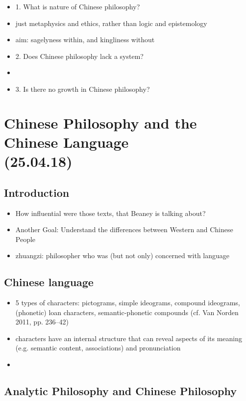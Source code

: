 \documentclass[emulatestandardclasses]{scrartcl}
\begin{document}
\begin{itemize}
  \item 1. What is nature of Chinese philosophy?
  \item just metaphysics and ethics, rather than logic and epistemology
  \item aim: sagelyness within, and kingliness without
  \item 2. Does Chinese philosophy lack a system?
  \item 
  \item 3. Is there no growth in Chinese philosophy?
\end{itemize}


\section{Chinese Philosophy and the Chinese Language\\(25.04.18)}

\subsection{Introduction}

\begin{itemize}
  \item How influential were those texts, that Beaney is talking about?
  \item Another Goal: Understand the differences between Western and Chinese People
  \item zhuangzi: philosopher who was (but not only) concerned with language
\end{itemize}

\subsection{Chinese language}

\begin{itemize}
  \item 5 types of characters: pictograms, simple ideograms, compound ideograms, (phonetic) loan characters, semantic-phonetic compounds (cf. Van Norden 2011, pp. 236–42)
  \item characters have an internal structure that can reveal aspects of its meaning (e.g. semantic content, associations) and pronunciation
  \item 
\end{itemize}


\subsection{Analytic Philosophy and Chinese Philosophy}
\end{document}

